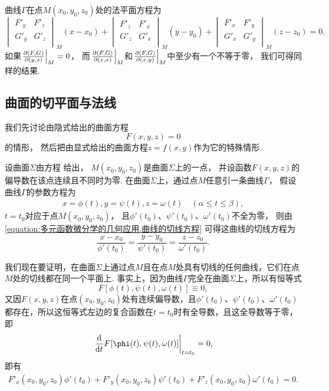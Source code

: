 曲线\(\Gamma\)在点\(M(x_0,y_0,z_0)\)处的法平面方程为
\begin{equation}\label{equation:多元函数微分学的几何应用.曲线的法平面方程.变式2}
	\begin{vmatrix}
		F'_y & F'_z \\
		G'_y & G'_z \\
	\end{vmatrix}_M
	(x-x_0)
	+ \begin{vmatrix}
		F'_z & F'_x \\
		G'_z & G'_x \\
	\end{vmatrix}_M
	(y-y_0)
	+ \begin{vmatrix}
		F'_x & F'_y \\
		G'_x & G'_y \\
	\end{vmatrix}_M
	(z-z_0)
	= 0.
\end{equation}
如果\(\eval{\jacobi{F,G}{y,z}}_M = 0\)，
而\(\eval{\jacobi{F,G}{z,x}}_M\)和\(\eval{\jacobi{F,G}{x,y}}_M\)中至少有一个不等于零，
我们可得同样的结果.

\subsection{曲面的切平面与法线}
我们先讨论由隐式给出的曲面方程 
\[
	F(x,y,z) = 0
\]的情形，
然后把由显式给出的曲面方程\(z = f(x,y)\)作为它的特殊情形.

设曲面\(\Sigma\)由方程  给出，
\(M(x_0,y_0,z_0)\)是曲面\(\Sigma\)上的一点，
并设函数\(F(x,y,z)\)的偏导数在该点连续且不同时为零.
在曲面\(\Sigma\)上，通过点\(M\)任意引一条曲线\(\Gamma\)，
假设曲线\(\Gamma\)的参数方程为\begin{gather}
	x = \phi(t),
	y = \psi(t),
	z = \omega(t)
	\quad (\alpha \leq t \leq \beta),
	\tag{16}
\end{gather}
\(t = t_0\)对应于点\(M(x_0,y_0,z_0)\)，
且\(\phi'(t_0)\)、\(\psi'(t_0)\)、\(\omega'(t_0)\)不全为零，
则由\cref{equation:多元函数微分学的几何应用.曲线的切线方程}
可得这曲线的切线方程为\[
	\frac{x-x_0}{\phi'(t_0)}
	=\frac{y-y_0}{\psi'(t_0)}
	=\frac{z-z_0}{\omega'(t_0)}.
\]

我们现在要证明，在曲面\(\Sigma\)上通过点\(M\)且在点\(M\)处具有切线的任何曲线，它们在点\(M\)处的切线都在同一个平面上.
事实上，因为曲线\(\Gamma\)完全在曲面\(\Sigma\)上，所以有恒等式\[
F[\phi(t),\psi(t),\omega(t)] \equiv 0,
\]又因\(F(x,y,z)\)在点\((x_0,y_0,z_0)\)处有连续偏导数，且\(\phi'(t_0)\)、\(\psi'(t_0)\)、\(\omega'(t_0)\)都存在，所以这恒等式左边的复合函数在\(t = t_0\)时有全导数，且这全导数等于零，即\[
\eval{\dv{t} F[\phi(t),\psi(t),\omega(t)]}_{t=t_0} = 0,
\]即有\begin{gather}
F'_x(x_0,y_0,z_0) \phi'(t_0)
+ F'_y(x_0,y_0,z_0) \psi'(t_0)
+ F'_z(x_0,y_0,z_0) \omega'(t_0)
= 0.
\tag{17}
\end{gather}

